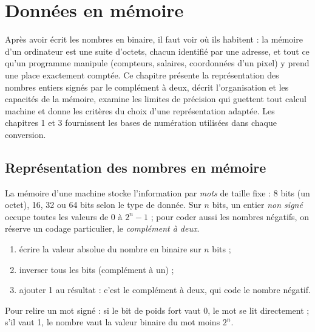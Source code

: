 \chapter{Données en mémoire}

\begin{quelqueslignes}
Après avoir écrit les nombres en binaire, il faut voir où ils habitent : la mémoire d'un ordinateur est une suite d'octets, chacun identifié par une adresse, et tout ce qu'un programme manipule (compteurs, salaires, coordonnées d'un pixel) y prend une place exactement comptée. Ce chapitre présente la représentation des nombres entiers signés par le complément à deux, décrit l'organisation et les capacités de la mémoire, examine les limites de précision qui guettent tout calcul machine et donne les critères du choix d'une représentation adaptée. Les chapitres 1 et 3 fournissent les bases de numération utilisées dans chaque conversion.
\end{quelqueslignes}

\section{Représentation des nombres en mémoire}

\begin{definition}
La mémoire d'une machine stocke l'information par \emph{mots} de taille fixe : 8 bits (un octet), 16, 32 ou 64 bits selon le type de donnée. Sur $n$ bits, un entier \emph{non signé} occupe toutes les valeurs de $0$ à $2^{n}-1$ ; pour coder aussi les nombres négatifs, on réserve un codage particulier, le \emph{complément à deux}.
\end{definition}

\begin{methode}
\begin{enumerate}
  \item écrire la valeur absolue du nombre en binaire sur $n$ bits ;
  \item inverser tous les bits (complément à un) ;
  \item ajouter 1 au résultat : c'est le complément à deux, qui code le nombre négatif.
\end{enumerate}
Pour relire un mot signé : si le bit de poids fort vaut 0, le mot se lit directement ; s'il vaut 1, le nombre vaut la valeur binaire du mot moins $2^{n}$.
\end{methode}

